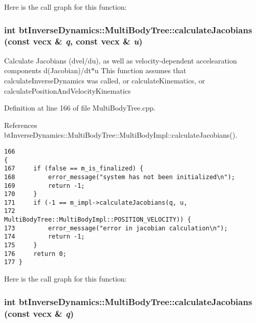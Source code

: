 Here is the call graph for this function:\hypertarget{classbt_inverse_dynamics_1_1_multi_body_tree_b28d924ffc2226b224e2046497162227}{
\subsubsection[calculateJacobians]{\setlength{\rightskip}{0pt plus 5cm}int btInverseDynamics::MultiBodyTree::calculateJacobians (const vecx \& {\em q}, \/  const vecx \& {\em u})}}
\label{classbt_inverse_dynamics_1_1_multi_body_tree_b28d924ffc2226b224e2046497162227}


Calculate Jacobians (dvel/du), as well as velocity-dependent accelearation components d(Jacobian)/dt$\ast$u This function assumes that calculateInverseDynamics was called, or calculateKinematics, or calculatePositionAndVelocityKinematics 

Definition at line 166 of file MultiBodyTree.cpp.

References btInverseDynamics::MultiBodyTree::MultiBodyImpl::calculateJacobians().

\begin{Code}\begin{verbatim}166                                                                   {
167     if (false == m_is_finalized) {
168         error_message("system has not been initialized\n");
169         return -1;
170     }
171     if (-1 == m_impl->calculateJacobians(q, u,
172                                          MultiBodyTree::MultiBodyImpl::POSITION_VELOCITY)) {
173         error_message("error in jacobian calculation\n");
174         return -1;
175     }
176     return 0;
177 }
\end{verbatim}
\end{Code}




Here is the call graph for this function:\hypertarget{classbt_inverse_dynamics_1_1_multi_body_tree_d036684dcd9a68f732bc37ba2a4ed894}{
\subsubsection[calculateJacobians]{\setlength{\rightskip}{0pt plus 5cm}int btInverseDynamics::MultiBodyTree::calculateJacobians (const vecx \& {\em q})}}
\label{classbt_inverse_dynamics_1_1_multi_body_tree_d036684dcd9a68f732bc37ba2a4ed894}


